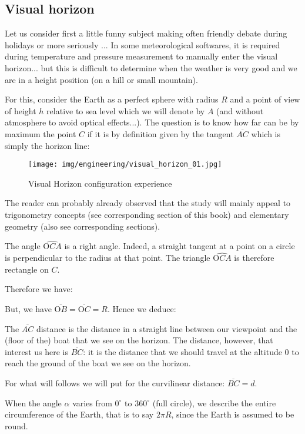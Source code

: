 	
	\subsection{Visual horizon}
	Let us consider first a little funny subject making often friendly debate during holidays or more seriously ... In some meteorological softwares, it is required during temperature and pressure measurement to manually enter the visual horizon... but this is difficult to determine when the weather is very good and we are in a height position (on a hill or small mountain).

	For this, consider the Earth as a perfect sphere with radius $R$ and a point of view of height $h$ relative to sea level which we will denote by $A$ (and without atmosphere to avoid optical effects...). The question is to know how far can be by maximum the point $C$ if it is by definition given by the tangent $\overline{AC}$ which is simply the horizon line:
	\begin{figure}[H]
		\begin{center}
			\texttt{[image: img/engineering/visual\_horizon\_01.jpg]}
			\caption{Visual Horizon configuration experience}
		\end{center}	
	\end{figure}	
	The reader can probably already observed that the study will mainly appeal to trigonometry concepts (see corresponding section of this book) and elementary geometry (also see corresponding sections).
	
	The angle $\widehat{\text{O}CA}$ is a right angle. Indeed, a straight tangent at a point on a circle is perpendicular to the radius at that point. The triangle $\widehat{\text{O}CA}$  is therefore rectangle on $C$.
	
	Therefore we have:
	
	But, we have $\overline{\text{O}B}=\overline{\text{O}C}=R$. Hence we deduce:
	
	The $\overline{AC}$ distance is the distance in a straight line between our viewpoint and the (floor of the) boat that we see on the horizon. The distance, however, that interest us here is $\overline{BC}$: it is the distance that we should travel at the altitude $0$ to reach the ground of the boat we see on the horizon.
	
	For what will follows we will put for the curvilinear distance: $\overline{BC}=d$.
	
	When the angle $\alpha$ varies from $0^{\circ}$ to $360^{\circ}$ (full circle), we describe the entire circumference of the Earth, that is to say $2\pi R$, since the Earth is assumed to be round.
	
